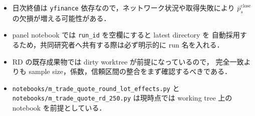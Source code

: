 \documentclass[a4paper,11pt]{jlreq}
\begin{document}
\begin{itemize}
  \item 日次終値は \texttt{yfinance} 依存なので，ネットワーク状況や取得失敗により
        \(\bar{p}^{\mathrm{close}}_s\) の欠損が増える可能性がある．
  \item panel notebook では \texttt{run\_id} を空欄にすると latest directory を
        自動採用するため，共同研究者へ共有する際は必ず明示的に run 名を入れる．
  \item RD の既存成果物では dirty worktree が前提になっているので，
        完全一致よりも sample size，係数，信頼区間の整合をまず確認するべきである．
  \item \texttt{notebooks/m\_trade\_quote\_round\_lot\_effects.py} と
        \texttt{notebooks/m\_trade\_quote\_rd\_250.py} は現時点では working tree 上の
        notebook を前提としている．
\end{itemize}
\end{document}
